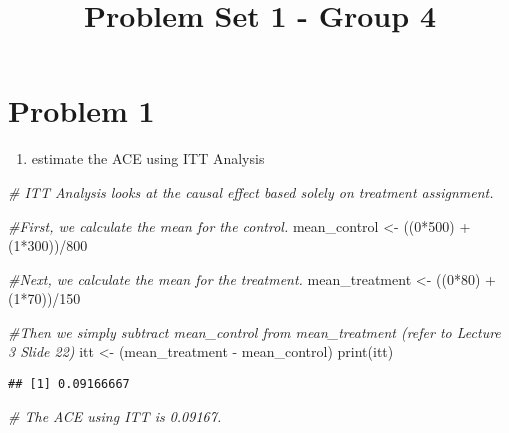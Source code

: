 \documentclass[
]{article}
\title{Problem Set 1 - Group 4}
\author{}
\date{\vspace{-2.5em}}
\newenvironment{Shaded}{\begin{snugshade}}{\end{snugshade}}
\newcommand{\CommentTok}[1]{\textcolor[rgb]{0.56,0.35,0.01}{\textit{#1}}}
\newcommand{\DecValTok}[1]{\textcolor[rgb]{0.00,0.00,0.81}{#1}}
\newcommand{\FunctionTok}[1]{\textcolor[rgb]{0.00,0.00,0.00}{#1}}
\newcommand{\NormalTok}[1]{#1}
\newcommand{\OtherTok}[1]{\textcolor[rgb]{0.56,0.35,0.01}{#1}}
\newcommand{\SpecialCharTok}[1]{\textcolor[rgb]{0.00,0.00,0.00}{#1}}
\providecommand{\tightlist}{%
  \setlength{\itemsep}{0pt}\setlength{\parskip}{0pt}}
\begin{document}
\maketitle

\hypertarget{problem-1}{%
\section{Problem 1}\label{problem-1}}

\begin{enumerate}
\def\labelenumi{\Alph{enumi})}
\tightlist
\item
  estimate the ACE using ITT Analysis
\end{enumerate}

\begin{Shaded}
\begin{Highlighting}[]
\CommentTok{\# ITT Analysis looks at the causal effect based solely on treatment assignment.}

\CommentTok{\#First, we calculate the mean for the control.}
\NormalTok{mean\_control }\OtherTok{\textless{}{-}}\NormalTok{ ((}\DecValTok{0}\SpecialCharTok{*}\DecValTok{500}\NormalTok{) }\SpecialCharTok{+}\NormalTok{ (}\DecValTok{1}\SpecialCharTok{*}\DecValTok{300}\NormalTok{))}\SpecialCharTok{/}\DecValTok{800}

\CommentTok{\#Next, we calculate the mean for the treatment. }
\NormalTok{mean\_treatment }\OtherTok{\textless{}{-}}\NormalTok{ ((}\DecValTok{0}\SpecialCharTok{*}\DecValTok{80}\NormalTok{) }\SpecialCharTok{+}\NormalTok{ (}\DecValTok{1}\SpecialCharTok{*}\DecValTok{70}\NormalTok{))}\SpecialCharTok{/}\DecValTok{150}

\CommentTok{\#Then we simply subtract mean\_control from mean\_treatment (refer to Lecture 3 Slide 22)}
\NormalTok{itt }\OtherTok{\textless{}{-}}\NormalTok{ (mean\_treatment }\SpecialCharTok{{-}}\NormalTok{ mean\_control)}
\FunctionTok{print}\NormalTok{(itt)}
\end{Highlighting}
\end{Shaded}

\begin{verbatim}
## [1] 0.09166667
\end{verbatim}

\begin{Shaded}
\begin{Highlighting}[]
\CommentTok{\# The ACE using ITT is 0.09167. }
\end{Highlighting}
\end{Shaded}
\end{document}

